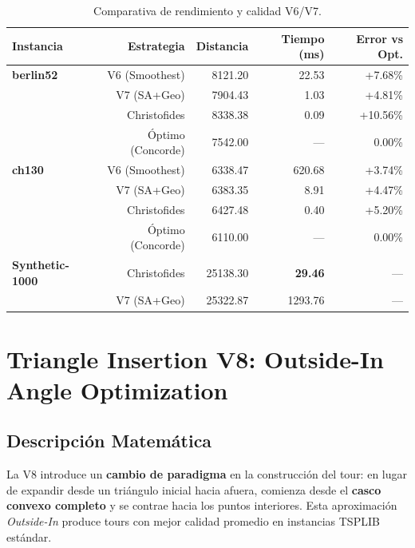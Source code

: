 \documentclass[12pt, a4paper]{article}
\begin{document}
\begin{table}[h]
    \centering
    \begin{tabular}{lrrrr}
        \toprule
        Instancia & Estrategia & Distancia & Tiempo (ms) & Error vs Opt. \\
        \midrule
        \textbf{berlin52} & V6 (Smoothest) & 8121.20 & 22.53 & +7.68\% \\
        & V7 (SA+Geo) & 7904.43 & 1.03 & +4.81\% \\
        & Christofides & 8338.38 & 0.09 & +10.56\% \\
        & Óptimo (Concorde) & 7542.00 & --- & 0.00\% \\
        \midrule
        \textbf{ch130} & V6 (Smoothest) & 6338.47 & 620.68 & +3.74\% \\
        & V7 (SA+Geo) & 6383.35 & 8.91 & +4.47\% \\
        & Christofides & 6427.48 & 0.40 & +5.20\% \\
        & Óptimo (Concorde) & 6110.00 & --- & 0.00\% \\
        \midrule
        \textbf{Synthetic-1000} & Christofides & 25138.30 & \textbf{29.46} & --- \\
        & V7 (SA+Geo) & 25322.87 & 1293.76 & --- \\
        \bottomrule
    \end{tabular}
    \caption{Comparativa de rendimiento y calidad V6/V7.}
\end{table}

\section{Triangle Insertion V8: Outside-In Angle Optimization}

\subsection{Descripción Matemática}
La V8 introduce un \textbf{cambio de paradigma} en la construcción del tour: en lugar de expandir desde un triángulo inicial hacia afuera, comienza desde el \textbf{casco convexo completo} y se contrae hacia los puntos interiores. Esta aproximación \textit{Outside-In} produce tours con mejor calidad promedio en instancias TSPLIB estándar.
\end{document}

